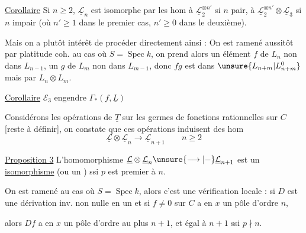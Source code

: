 \uline{Corollaire} Si $n\geq2$, $\underline{\mathcal L}_n$ est isomorphe par les hom  à $\underline{\mathcal L}_2^{\otimes n'}$ si $n$ pair, à $\underline{\mathcal L}_2^{\otimes n'}\otimes\underline{\mathcal L}_3$ si $n$ impair (où $n'\geq1$ dans le premier cas, $n'\geq0$ dans le deuxième).

Mais on a plutôt intérêt de procéder directement ainsi : On est ramené aussitôt par platitude coh. au cas où $S=\operatorname{Spec}k$, on prend alors un élément $f$ de $L_n$ non dans $L_{n-1}$, un $g$ de $L_m$ non dans $L_{m-1}$, donc $fg$ est dans $\unsure{L_{n+m}|L_{n+m}^{0}}$ mais  par  $L_n\otimes L_m$.

\uline{Corollaire} $\mathcal E_3$ engendre $\Gamma_*(f,\underline L)$

Considérons les opérations de $\underline T$ sur les germes de fonctions rationnelles sur $C$ [reste à définir], on constate que  ces opérations induisent des hom
\[
\underline{\mathcal L}\otimes\underline{\mathcal L}_n\longrightarrow\underline{\mathcal L}_{n+1}\qquad n\geq2
\]

\uline{Proposition 3}  L'homomorphisme $\underline{\mathcal L}\otimes\underline{\mathcal L}_n\unsure{\longrightarrow|-}\underline{\mathcal L}_{n+1}$ est un \uline{isomorphisme} (ou  un ) ssi $p$ est premier à $n$.

On est ramené au cas où $S=\operatorname{Spec}k$, alors c'est une vérification locale : si $D$ est une  dérivation inv. non nulle en un  et si $f\neq0$ sur $C$ a en $x$ un pôle d'ordre $n$,



 alors  $Df$ a en $x$ un pôle d'ordre au plus $n+1$, et égal à $n+1$ ssi $p\nmid n$.


